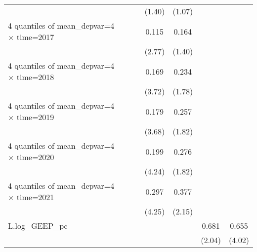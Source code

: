 \begin{table}[htbp]
\begin{tabular}{l*{6}{c}}
                    &                     &                     &      (1.40)         &      (1.07)         &                     &                     \\
[1em]
4 quantiles of mean\_depvar=4 $\times$ time=2017&                     &                     &       0.115\sym{**} &       0.164         &                     &                     \\
                    &                     &                     &      (2.77)         &      (1.40)         &                     &                     \\
[1em]
4 quantiles of mean\_depvar=4 $\times$ time=2018&                     &                     &       0.169\sym{***}&       0.234\sym{*}  &                     &                     \\
                    &                     &                     &      (3.72)         &      (1.78)         &                     &                     \\
[1em]
4 quantiles of mean\_depvar=4 $\times$ time=2019&                     &                     &       0.179\sym{***}&       0.257\sym{*}  &                     &                     \\
                    &                     &                     &      (3.68)         &      (1.82)         &                     &                     \\
[1em]
4 quantiles of mean\_depvar=4 $\times$ time=2020&                     &                     &       0.199\sym{***}&       0.276\sym{*}  &                     &                     \\
                    &                     &                     &      (4.24)         &      (1.82)         &                     &                     \\
[1em]
4 quantiles of mean\_depvar=4 $\times$ time=2021&                     &                     &       0.297\sym{***}&       0.377\sym{**} &                     &                     \\
                    &                     &                     &      (4.25)         &      (2.15)         &                     &                     \\
[1em]
L.log\_GEEP\_pc       &                     &                     &                     &                     &       0.681\sym{*}  &       0.655\sym{***}\\
                    &                     &                     &                     &                     &      (2.04)         &      (4.02)         \\

\end{tabular}
\end{table}

